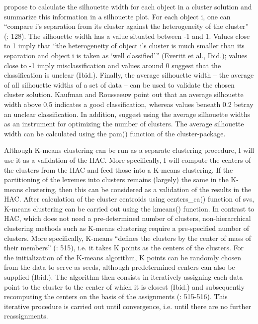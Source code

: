 \citet{kaufman_finding_1990} propose to calculate the silhouette width for each object in a cluster solution and summarize this information in a silhouette plot. For each object i, one can “compare i’s separation from its cluster against the heterogeneity of the cluster” (\citealt{everitt_cluster_2011}: 128). The silhouette width has a value situated between -1 and 1. Values close to 1 imply that “the heterogeneity of object i’s cluster is much smaller than its separation and object i is taken as ‘well classified’” (Everitt et al., Ibid.); values close to -1 imply misclassification and values around 0 suggest that the classification is unclear (Ibid.). Finally, the average silhouette width – the average of all silhouette widths of a set of data – can be used to validate the chosen cluster solution. Kaufman and Rousseeuw point out that an average silhouette width above 0,5 indicates a good classification, whereas values beneath 0.2 betray an unclear classification. In addition, \citet[129]{everitt_cluster_2011} suggest using the average silhouette widths as an instrument for optimizing the number of clusters. The average silhouette width can be calculated using the pam() function of the cluster{}-package.



Although K-means clustering can be run as a separate clustering procedure, I will use it as a validation of the HAC. More specifically, I will compute the centers of the clusters from the HAC and feed those into a K-means clustering. If the partitioning of the lexemes into clusters remains (largely) the same in the K-means clustering, then this can be considered as a validation of the results in the HAC. After calculation of the cluster centroids using centers\_ca() function of svs, K-means clustering can be carried out using the kmeans() function. In contrast to HAC, which does not need a pre-determined number of clusters, non-hierarchical clustering methods such as K-means clustering require a pre-specified number of clusters. More specifically, K-means “defines the clusters by the center of mass of their members” (\citealt{manning_foundations_1999}: 515), i.e. it takes K points as the centers of the clusters. For the initialization of the K-means algorithm, K points can be randomly chosen from the data to serve as seeds, although predetermined centers can also be supplied (Ibid.). The algorithm then consists in iteratively assigning each data point to the cluster to the center of which it is closest (Ibid.) and subsequently recomputing the centers on the basis of the assignments (\citealt{manning_foundations_1999}: 515-516). This iterative procedure is carried out until convergence, i.e. until there are no further reassignments.


